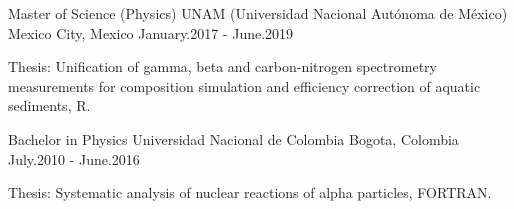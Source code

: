 

\begin{cventries}

  \cventry
    {Master of Science (Physics)} %
    {UNAM (Universidad Nacional Autónoma de México)} %
    {Mexico City,  Mexico} %
    {January.2017 - June.2019} %
    {
      \begin{cvitems} %
        \item {Thesis: Unification of gamma, beta and carbon-nitrogen spectrometry measurements for composition simulation and efficiency correction of aquatic sediments, R. }
      \end{cvitems}
    }
  \cventry
    {Bachelor in Physics} %
    {Universidad Nacional de Colombia} %
    {Bogota,  Colombia} %
    {July.2010 - June.2016} %
    {
      \begin{cvitems} %
        \item {Thesis: Systematic analysis of nuclear reactions of alpha particles, FORTRAN.}
      \end{cvitems}
    }
\end{cventries}
